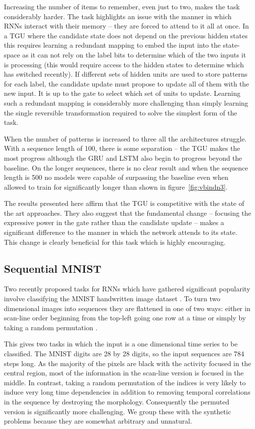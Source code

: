 Increasing the number of items to remember, even just to two, makes the
task considerably harder. The task highlights an issue with the manner
in which RNNs interact with their memory -- they are forced to attend to it all
at once. In a TGU where the candidate state does not
depend on the previous hidden states this requires learning a redundant mapping to embed
the input into the state-space as it can not rely on the label
bits to determine which of the two inputs it is processing (this would require
access to the hidden states to determine which has switched recently). If
different sets of hidden units are used to store patterns for each label,
the candidate update must propose to update all of them
with the new input. It is up to the gate to select which set of units to update.
Learning such a redundant
mapping is considerably more challenging than simply learning the single
reversible transformation required to solve the simplest form of the task.

When the number of patterns is increased to three all the architectures struggle.
With a sequence length of 100, there is some separation -- the TGU makes the most
progress although the GRU and LSTM also begin to progress beyond the baseline.
On the longer sequences, there is no clear result and when the sequence
length is 500 no models were capable of surpassing the baseline even when
allowed to train for significantly longer than shown in figure~\ref{fig:vbindn3}.

The results presented here affirm that the TGU is competitive with the state of the art approaches.
They also suggest that the fundamental change -- focusing the expressive power in the
gate rather than the candidate update -- makes a significant
difference to the manner in which the network attends to its state. This change is clearly
beneficial for this task which is highly encouraging.


\subsection{Sequential MNIST}
Two recently proposed tasks for RNNs which have gathered significant popularity
involve classifying the MNIST handwritten image dataset 
\autocite{Lecun1998}. To turn two dimensional images into sequences they are
flattened in one of two ways: either in scan-line order beginning from the top-left
going one row at a time or simply by taking a random permutation \autocite{Le2015}.

This gives two tasks in which the input is a one dimensional time series to be
classified. The MNIST digits are 28 by 28 digits, so the input sequences are
784 steps long. As the majority of the pixels are black with the activity focused
in the central region, most of the information in the scan-line version
is focused in the middle. In contrast, taking a random permutation of the indices
is very likely to induce very long time dependencies in addition to removing
temporal correlations in the sequence by destroying the morphology. Consequently
the permuted version is significantly more challenging. We group these with the
synthetic problems because they are somewhat arbitrary and unnatural.

